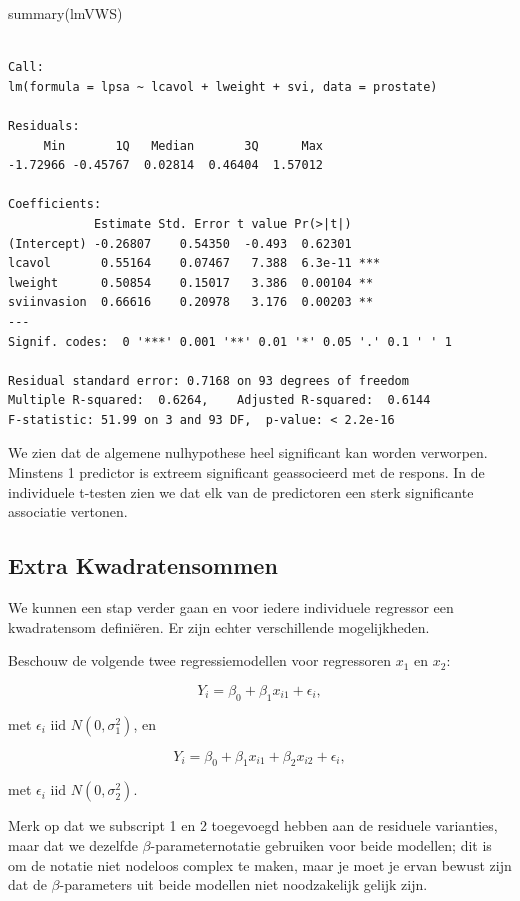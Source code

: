 \documentclass[
  dutch,
  letterpaper,
  12pt]{book}
\newenvironment{Shaded}{\begin{snugshade}}{\end{snugshade}}
\newcommand{\FunctionTok}[1]{\textcolor[rgb]{0.28,0.35,0.67}{#1}}
\newcommand{\NormalTok}[1]{\textcolor[rgb]{0.00,0.23,0.31}{#1}}
\theoremstyle{definition}
\theoremstyle{definition}
\theoremstyle{definition}
\theoremstyle{remark}
\begin{document}
\begin{Shaded}
\begin{Highlighting}[]
\FunctionTok{summary}\NormalTok{(lmVWS)}
\end{Highlighting}
\end{Shaded}

\begin{verbatim}

Call:
lm(formula = lpsa ~ lcavol + lweight + svi, data = prostate)

Residuals:
     Min       1Q   Median       3Q      Max 
-1.72966 -0.45767  0.02814  0.46404  1.57012 

Coefficients:
            Estimate Std. Error t value Pr(>|t|)    
(Intercept) -0.26807    0.54350  -0.493  0.62301    
lcavol       0.55164    0.07467   7.388  6.3e-11 ***
lweight      0.50854    0.15017   3.386  0.00104 ** 
sviinvasion  0.66616    0.20978   3.176  0.00203 ** 
---
Signif. codes:  0 '***' 0.001 '**' 0.01 '*' 0.05 '.' 0.1 ' ' 1

Residual standard error: 0.7168 on 93 degrees of freedom
Multiple R-squared:  0.6264,    Adjusted R-squared:  0.6144 
F-statistic: 51.99 on 3 and 93 DF,  p-value: < 2.2e-16
\end{verbatim}

We zien dat de algemene nulhypothese heel significant kan worden
verworpen. Minstens 1 predictor is extreem significant geassocieerd met
de respons. In de individuele t-testen zien we dat elk van de
predictoren een sterk significante associatie vertonen.

\subsection{Extra Kwadratensommen}\label{extra-kwadratensommen}

We kunnen een stap verder gaan en voor iedere individuele regressor een
kwadratensom definiëren. Er zijn echter verschillende mogelijkheden.

Beschouw de volgende twee regressiemodellen voor regressoren \(x_1\) en
\(x_2\):

\[
  Y_i = \beta_0+\beta_1 x_{i1} + \epsilon_i,
\]

met \(\epsilon_i\text{ iid } N(0,\sigma_1^{2})\), en

\[
Y_i = \beta_0+\beta_1 x_{i1}+\beta_2 x_{i2} + \epsilon_i,
\]

met \(\epsilon_i\text{ iid } N(0,\sigma_2^{2})\).

Merk op dat we subscript 1 en 2 toegevoegd hebben aan de residuele
varianties, maar dat we dezelfde \(\beta\)-parameternotatie gebruiken
voor beide modellen; dit is om de notatie niet nodeloos complex te
maken, maar je moet je ervan bewust zijn dat de \(\beta\)-parameters uit
beide modellen niet noodzakelijk gelijk zijn.
\end{document}
